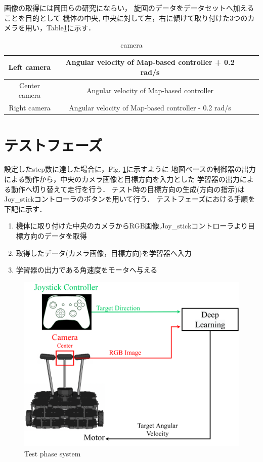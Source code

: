   画像の取得には岡田らの研究\cite{okada}にならい，
旋回のデータをデータセットへ加えることを目的として
機体の中央, 中央に対して左，右に傾けて取り付けた3つのカメラを用い，Table\ref{tb::camera_ang}に示す．
\begin{table}[H]
  \centering
  \caption{camera }
  \begin{tabular}{|c|c|ll}
  \hline
  Left camera   & Angular velocity of Map-based controller + 0.2 rad/s \\ \hline
  Center camera & Angular velocity of Map-based controller             \\ \hline
  Right camera  & Angular velocity of Map-based controller - 0.2 rad/s  \\ \hline
  \end{tabular}
  \label{tb::camera_ang}
  \end{table}

\newpage
\section{テストフェーズ}
\label{test}
設定したstep数に達した場合に，Fig. \ref{fig::testsystem}に示すように
地図ベースの制御器の出力による動作から，中央のカメラ画像と目標方向を入力とした
学習器の出力による動作へ切り替えて走行を行う．
テスト時の目標方向の生成(方向の指示)はJoy\_stickコントローラのボタンを用いて行う．
テストフェーズにおける手順を下記に示す．
\begin{enumerate}
    \item 機体に取り付けた中央のカメラからRGB画像,Joy\_stickコントローラより目標方向のデータを取得
    \item 取得したデータ(カメラ画像，目標方向)を学習器へ入力
    \item 学習器の出力である角速度をモータへ与える
  \end{enumerate}


\begin{figure}[h]
    \centering
    \includegraphics[width = 12cm]{./figs/system_test.pdf}
    \caption{Test phase system}
    \label{fig::testsystem}
\end{figure}

